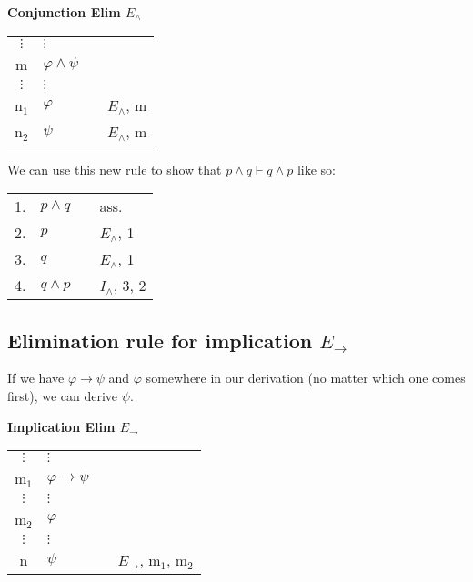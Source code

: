 \documentclass[nobib,nofonts]{tufte-handout}
\begin{document}
\bigskip
\noindent \colorbox{mygray!60}{\centering
  \begin{minipage}[t]{0.35\linewidth}
    \textbf{Conjunction Elim $E_{\wedge}$}
  \end{minipage}
  \begin{minipage}[t]{0.55\linewidth}
    \begin{tabular}{clcl}
      $\vdots$ & $\vdots$              & \\
      m        & $\varphi \wedge \psi$ &  \\
      $\vdots$ & $\vdots$              & \\
      n$_{1}$  & $\varphi$             & & $E_{\wedge}$, m \\
      n$_{2}$  & $\psi$                & & $E_{\wedge}$, m
    \end{tabular}
  \end{minipage}
}
\bigskip

We can use this new rule to show that $p \wedge q \vdash q \wedge p$ like so:

\begin{tabular}{clcl}
  1. & $p \wedge q$ & & ass. \\
  2. & $p$          & & $E_{\wedge}$, 1 \\
  3. & $q$          & & $E_{\wedge}$, 1 \\
  4. & $q \wedge p$ & & $I_{\wedge}$, 3, 2
\end{tabular}


\subsection{Elimination rule for implication $E_{\rightarrow}$}

If we have $\varphi \rightarrow \psi$ and $\varphi$ somewhere in our derivation (no matter which one comes first), we can derive $\psi$.

\bigskip
\noindent \colorbox{mygray!60}{\centering
  \begin{minipage}[t]{0.35\linewidth}
    \textbf{Implication Elim $E_{\rightarrow}$}
  \end{minipage}
  \begin{minipage}[t]{0.55\linewidth}
    \begin{tabular}{clcl}
      $\vdots$ & $\vdots$                   & \\
      m$_{1}$  & $\varphi \rightarrow \psi$ &  \\
      $\vdots$ & $\vdots$                   & \\
      m$_{2}$  & $\varphi$                  &  \\
      $\vdots$ & $\vdots$                   & \\
      n        & $\psi$                     & & $E_{\rightarrow}$, m$_{1}$, m$_{2}$
    \end{tabular}
  \end{minipage}
}
\bigskip
\end{document}
